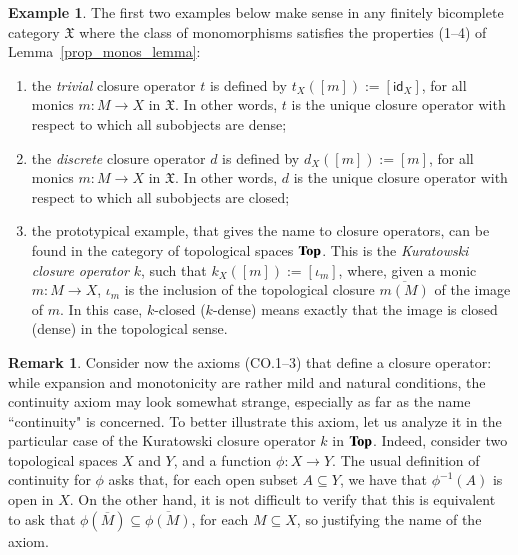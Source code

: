 \documentclass[12pt]{article}
\theoremstyle{definition}
\newtheorem{remark}[lemma]{Remark}
\newtheorem{example}[lemma]{Example}
\def\X{\mathfrak X}
\renewcommand{\Top}{\textbf{\textup{Top}}}
\numberwithin{equation}{section}
\newcommand{\id}[1]{\mathsf{id}_{#1}}
\begin{document}
\begin{example}\label{ex_CO_easy}
The first two examples below make sense in any finitely bicomplete category $\X$ where the class of monomorphisms satisfies the properties (1--4) of Lemma~\ref{prop_monos_lemma}:
\begin{enumerate}[\rm (1)]
\item the {\em trivial} closure operator $t$ is defined by $t_X([m]):=[\id{X}]$, for all monics $m:M\rightarrow X$ in $\X$. In other words, $t$ is the unique closure operator with respect to which all subobjects are dense;
\item  the {\em discrete}  closure operator $d$ is defined by $d_X([m]) := [m]$, for all monics $m:M\rightarrow X$ in $\X$. In other words, $d$ is the unique closure operator with respect to which all subobjects are closed;
\item the prototypical example, that gives the name to closure operators, can be found in the category of topological spaces $\Top$. This is the {\em Kuratowski closure operator} $k$, such that $k_X([m]):=[\iota_m]$, where, given a monic $m:M\rightarrow X$, $\iota_m$ is the inclusion of the topological closure $\overline{m(M)}$ of the image of $m$. In this case, $k$-closed ($k$-dense) means exactly that the image is closed (dense) in the topological sense.
\end{enumerate}
\end{example}
\begin{remark}
	Consider now the axioms (CO.1--3) that define a closure operator: while expansion and monotonicity are rather mild and natural conditions, the continuity axiom may look somewhat strange, especially as far as the name ``continuity" is concerned. To better illustrate this axiom, let us analyze it in the particular case of the Kuratowski closure operator $k$ in $\Top$. Indeed, consider two topological spaces $X$ and $Y$, and a function $\phi\colon X\to Y$. The usual definition of continuity for $\phi$ asks that, for each open subset $A\subseteq Y$, we have that $\phi^{-1}(A)$ is open in $X$. On the other hand, it is not difficult to verify that this is equivalent to ask that $\phi(\overline{M}) \subseteq  \overline{\phi(M)}$, for each $M \subseteq X$, so justifying the name of the axiom.
\end{remark}
\end{document}
